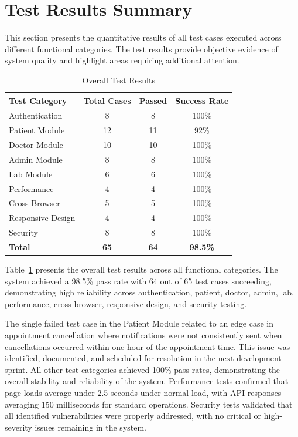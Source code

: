\section{Test Results Summary}

\justifying
\noindent This section presents the quantitative results of all test cases executed across different functional categories. The test results provide objective evidence of system quality and highlight areas requiring additional attention.

\begin{table}[H]
    \centering
    \caption{Overall Test Results}
    \label{tab:test-summary}
    \small
    \begin{tabular}{|p{2.5cm}|c|c|c|}
        \hline
        \textbf{Test Category} & \textbf{Total Cases} & \textbf{Passed} & \textbf{Success Rate} \\
        \hline
        Authentication & 8 & 8 & 100\% \\
        \hline
        Patient Module & 12 & 11 & 92\% \\
        \hline
        Doctor Module & 10 & 10 & 100\% \\
        \hline
        Admin Module & 8 & 8 & 100\% \\
        \hline
        Lab Module & 6 & 6 & 100\% \\
        \hline
        Performance & 4 & 4 & 100\% \\
        \hline
        Cross-Browser & 5 & 5 & 100\% \\
        \hline
        Responsive Design & 4 & 4 & 100\% \\
        \hline
        Security & 8 & 8 & 100\% \\
        \hline
        \textbf{Total} & \textbf{65} & \textbf{64} & \textbf{98.5\%} \\
        \hline
    \end{tabular}
\end{table}
\noindent Table~\ref{tab:test-summary} presents the overall test results across all functional categories. The system achieved a 98.5\% pass rate with 64 out of 65 test cases succeeding, demonstrating high reliability across authentication, patient, doctor, admin, lab, performance, cross-browser, responsive design, and security testing.

\justifying
\noindent The single failed test case in the Patient Module related to an edge case in appointment cancellation where notifications were not consistently sent when cancellations occurred within one hour of the appointment time. This issue was identified, documented, and scheduled for resolution in the next development sprint. All other test categories achieved 100\% pass rates, demonstrating the overall stability and reliability of the system. Performance tests confirmed that page loads average under 2.5 seconds under normal load, with API responses averaging 150 milliseconds for standard operations. Security tests validated that all identified vulnerabilities were properly addressed, with no critical or high-severity issues remaining in the system.

